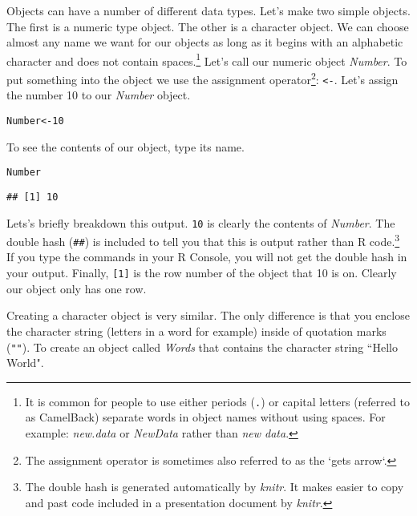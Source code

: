 Objects can have a number of different data types. Let's make two simple objects. The first is a numeric type object. The other is a character object. We can choose almost any name we want for our objects as long as it begins with an alphabetic character and does not contain spaces.\footnote{It is common for people to use either periods (\texttt{.}) or capital letters (referred to as CamelBack) separate words in object names without using spaces. For example: {\emph{new.data}} or {\emph{NewData}} rather than {\emph{new data}}.} Let's call our numeric object {\emph{Number}}. To put something into the object we use the assignment operator\footnote{The assignment operator is sometimes also referred to as the `gets arrow`.}: {\tt{\textless -}}. Let's assign the number 10 to our {\emph{Number}} object.

\begin{knitrout}
\color{fgcolor}\begin{kframe}
\begin{alltt}
Number <- 10
\end{alltt}
\end{kframe}
\end{knitrout}


\noindent To see the contents of our object, type its name.

\begin{knitrout}
\color{fgcolor}\begin{kframe}
\begin{alltt}
Number
\end{alltt}
\begin{verbatim}
## [1] 10
\end{verbatim}
\end{kframe}
\end{knitrout}


\noindent Lets's briefly breakdown this output. \texttt{10} is clearly the contents of {\emph{Number}}. The double hash (\texttt{\#\#}) is included to tell you that this is output rather than R code.\footnote{The double hash is generated automatically by {\emph{knitr}}. It makes easier to copy and past code included in a presentation document by {\emph{knitr}}.} If you type the commands in your R Console, you will not get the double hash in your output. Finally, \texttt{[1]} is the row number of the object that 10 is on. Clearly our object only has one row.   

Creating a character object is very similar. The only difference is that you enclose the character string (letters in a word for example) inside of quotation marks ({\tt{""}}). To create an object called {\emph{Words}} that contains the character string ``Hello World".\label{StringObject}


